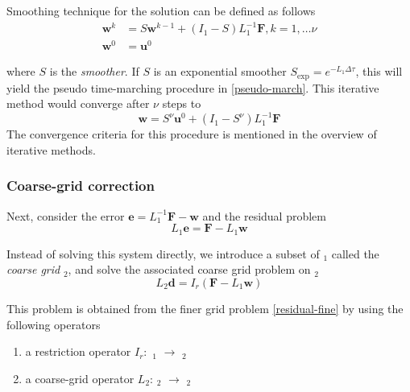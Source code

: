 Smoothing technique for the solution can be defined as follows
\begin{equation}
\begin{split}
    \mathbf{w}^k &= S\mathbf{w}^{k-1} + (I_1 - S)L_1^{-1}\mathbf{F}, k = 1, \dots \nu \\
    \mathbf{w}^0 &= \mathbf{u}^0
\end{split}
\end{equation}

where $S$ is the \textit{smoother}. If $S$ is an exponential smoother $S_{\text{exp}} = e^{-L_1\Delta\tau}$, this will yield the pseudo time-marching procedure in \autoref{pseudo-march}. This iterative method would converge after $\nu$ steps to 
\begin{equation}
    \mathbf{w} = S^{\nu} \mathbf{u}^0 + (I_1 - S^{\nu})L_1^{-1}\mathbf{F}
    \label{converged_iter}
\end{equation}
The convergence criteria for this procedure is mentioned in the overview of iterative methods.

\subsubsection{Coarse-grid correction}

Next, consider the error $\mathbf{e} = L_1^{-1}\mathbf{F} - \mathbf{w}$ and the residual problem
\begin{equation}
    L_1\mathbf{e} = \mathbf{F} - L_1\mathbf{w}    
    \label{residual-fine}
\end{equation}

Instead of solving this system directly, we introduce a subset of \text{$\Omega$}$_1$ called the \textit{coarse grid} \text{$\Omega$}$_2$, and solve the associated coarse grid problem on \text{$\Omega$}$_2$
\begin{equation}
    L_2\mathbf{d} = I_r(\mathbf{F} - L_1\mathbf{w})
    \label{correction_problem}
\end{equation}

This problem is obtained from the finer grid problem \autoref{residual-fine} by using the following operators

\begin{enumerate}
    \item a restriction operator $I_r:$ \text{$\Omega$}$_1$ $\xrightarrow{}$ \text{$\Omega$}$_2$
    \item a coarse-grid operator $L_2$: \text{$\Omega$}$_2$ $\xrightarrow{}$ \text{$\Omega$}$_2$
\end{enumerate}

